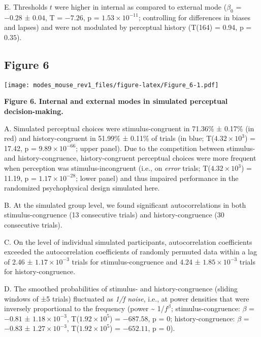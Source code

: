 \documentclass[
]{article}
\begin{document}
E. Thresholds \(t\) were higher in internal as compared to external mode
(\(\beta_0\) = \(-0.28\) ± \(0.04\), T = \(-7.26\), p =
\(\ensuremath{1.53\times 10^{-11}}\); controlling for differences in
biases and lapses) and were not modulated by perceptual history (T(164)
= 0.94, p = \(0.35\)).

\newpage

\hypertarget{figure-6}{%
\subsection{Figure 6}\label{figure-6}}

\texttt{[image: modes\_mouse\_rev1\_files/figure-latex/Figure\_6-1.pdf]}

\textbf{Figure 6. Internal and external modes in simulated perceptual
decision-making.}

A. Simulated perceptual choices were stimulus-congruent in 71.36\% ±
0.17\% (in red) and history-congruent in 51.99\% ± 0.11\% of trials (in
blue; T(\ensuremath{4.32\times 10^{3}}) = 17.42, p =
\(\ensuremath{9.89\times 10^{-66}}\); upper panel). Due to the
competition between stimulus- and history-congruence, history-congruent
perceptual choices were more frequent when perception was
stimulus-incongruent (i.e., on \emph{error} trials;
T(\ensuremath{4.32\times 10^{3}}) = 11.19, p =
\(\ensuremath{1.17\times 10^{-28}}\); lower panel) and thus impaired
performance in the randomized psychophysical design simulated here.

B. At the simulated group level, we found significant autocorrelations
in both stimulus-congruence (13 consecutive trials) and
history-congruence (30 consecutive trials).

C. On the level of individual simulated participants, autocorrelation
coefficients exceeded the autocorrelation coefficients of randomly
permuted data within a lag of 2.46 ± \ensuremath{1.17\times 10^{-3}}
trials for stimulus-congruence and 4.24 ±
\ensuremath{1.85\times 10^{-3}} trials for history-congruence.

D. The smoothed probabilities of stimulus- and history-congruence
(sliding windows of ±5 trials) fluctuated as \emph{1/f noise}, i.e., at
power densities that were inversely proportional to the frequency (power
\textasciitilde{} 1/\(f^\beta\); stimulus-congruence: \(\beta\) =
\(-0.81\) ± \(\ensuremath{1.18\times 10^{-3}}\),
T(\(\ensuremath{1.92\times 10^{5}}\)) = \(-687.58\), p = \(0\);
history-congruence: \(\beta\) = \(-0.83\) ±
\(\ensuremath{1.27\times 10^{-3}}\),
T(\(\ensuremath{1.92\times 10^{5}}\)) = \(-652.11\), p = \(0\)).
\end{document}
